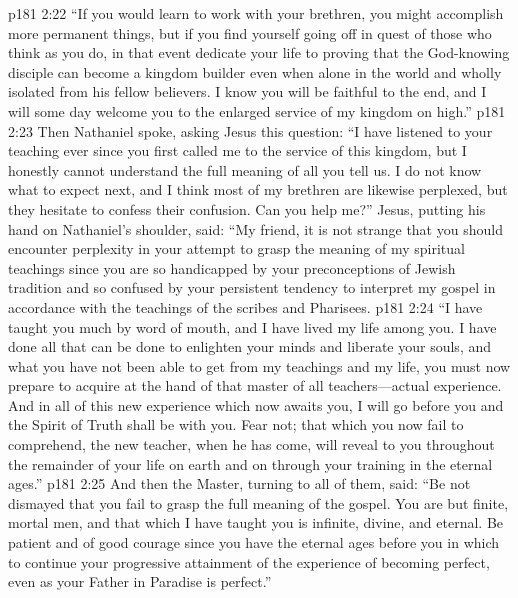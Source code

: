 \vs p181 2:22 \textcolor{ubdarkred}{“If you would learn to work with your brethren, you might accomplish more permanent things, but if you find yourself going off in quest of those who think as you do, in that event dedicate your life to proving that the God\hyp{}knowing disciple can become a kingdom builder even when alone in the world and wholly isolated from his fellow believers. I know you will be faithful to the end, and I will some day welcome you to the enlarged service of my kingdom on high.”}
\vs p181 2:23 Then Nathaniel spoke, asking Jesus this question: “I have listened to your teaching ever since you first called me to the service of this kingdom, but I honestly cannot understand the full meaning of all you tell us. I do not know what to expect next, and I think most of my brethren are likewise perplexed, but they hesitate to confess their confusion. Can you help me?” Jesus, putting his hand on Nathaniel’s shoulder, said: \textcolor{ubdarkred}{“My friend, it is not strange that you should encounter perplexity in your attempt to grasp the meaning of my spiritual teachings since you are so handicapped by your preconceptions of Jewish tradition and so confused by your persistent tendency to interpret my gospel in accordance with the teachings of the scribes and Pharisees.}
\vs p181 2:24 \textcolor{ubdarkred}{“I have taught you much by word of mouth, and I have lived my life among you. I have done all that can be done to enlighten your minds and liberate your souls, and what you have not been able to get from my teachings and my life, you must now prepare to acquire at the hand of that master of all teachers---actual experience. And in all of this new experience which now awaits you, I will go before you and the Spirit of Truth shall be with you. Fear not; that which you now fail to comprehend, the new teacher, when he has come, will reveal to you throughout the remainder of your life on earth and on through your training in the eternal ages.”}
\vs p181 2:25 And then the Master, turning to all of them, said: \textcolor{ubdarkred}{“Be not dismayed that you fail to grasp the full meaning of the gospel. You are but finite, mortal men, and that which I have taught you is infinite, divine, and eternal. Be patient and of good courage since you have the eternal ages before you in which to continue your progressive attainment of the experience of becoming perfect, even as your Father in Paradise is perfect.”}
